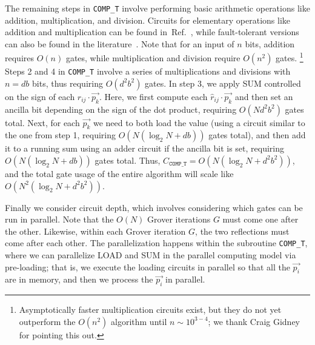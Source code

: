 \documentclass[aps,prd,twocolumn,superscriptaddress,preprintnumbers,nofootinbib,longbibliography,floatfix]{revtex4-1}
\DeclareRobustCommand{\Ref}[1]{Ref.~\cite{#1}}
\begin{document}
The remaining steps in \texttt{COMP\_T} involve performing basic arithmetic operations like addition, multiplication, and division.
%
Circuits for elementary operations like addition and multiplication can be found in~\Ref{Vedral:1995ga}, while fault-tolerant versions can also be found in the literature~\cite{gidney, thapliyal}.
%
Note that for an input of $n$ bits, addition requires $O(n)$ gates,
while multiplication and division require $O(n^2)$ gates.%
%
\footnote{Asymptotically faster multiplication circuits exist, but they do not yet
outperform the $O(n^2)$ algorithm until $n \sim 10^{3-4}$; we thank
Craig Gidney for pointing this out.}
%
Steps 2 and 4 in \texttt{COMP\_T} involve a series of multiplications and divisions with $n=db$ bits, thus requiring $O(d^2b^2)$ gates.
%
In step 3, we apply SUM controlled on the sign of each $\hat{r}_{ij}\cdot\vec{p_k}$.
%
Here, we first compute each $\hat{r}_{ij}\cdot\vec{p_k}$ and then set an ancilla bit depending on the sign of the dot product, requiring $O(Nd^2b^2)$ gates total.
%
Next, for each $\vec{p_k}$ we need to both load the value (using a circuit similar to the one from step 1, requiring $O(N(\log_2 N + db))$ gates total), and then add it to a running sum using an adder circuit if the ancilla bit is set, requiring $O(N(\log_2 N+db))$ gates total.
%
Thus, $C_{\texttt{COMP\_T}}=O(N(\log_2 N + d^2b^2))$, and the total gate usage of the entire algorithm will scale like $O(N^2(\log_2 N + d^2b^2))$.


Finally we consider circuit depth, which involves considering which gates can be run in parallel.
%
Note that the $O(N)$ Grover iterations $G$ must come one after the other.
%
Likewise, within each Grover iteration $G$, the two reflections must come after each other.
%
The parallelization happens within the subroutine \texttt{COMP\_T}, where we can parallelize LOAD and SUM in the parallel computing model via pre-loading; that is, we execute the loading circuits in parallel so that all the $\vec{p_i}$ are in memory, and then we process the $\vec{p_i}$ in parallel.
\end{document}
